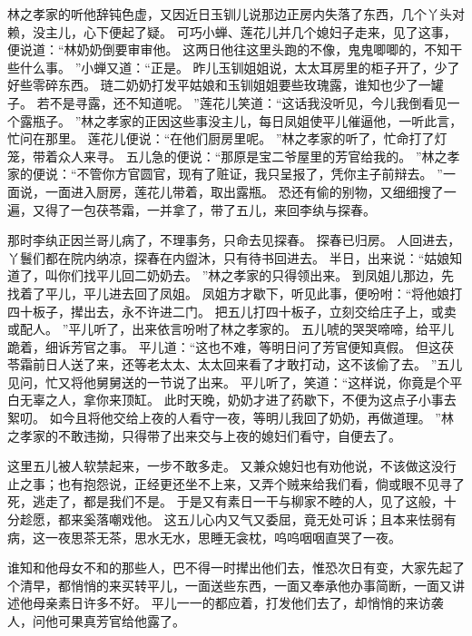 林之孝家的听他辞钝色虚，又因近日玉钏儿说那边正房内失落了东西，几个丫头对赖，没主儿，心下便起了疑。
可巧小蝉、莲花儿并几个媳妇子走来，见了这事，便说道：“林奶奶倒要审审他。
这两日他往这里头跑的不像，鬼鬼唧唧的，不知干些什么事。
”小蝉又道：“正是。
昨儿玉钏姐姐说，太太耳房里的柜子开了，少了好些零碎东西。
琏二奶奶打发平姑娘和玉钏姐姐要些玫瑰露，谁知也少了一罐子。
若不是寻露，还不知道呢。
”莲花儿笑道：“这话我没听见，今儿我倒看见一个露瓶子。
”林之孝家的正因这些事没主儿，每日凤姐使平儿催逼他，一听此言，忙问在那里。
莲花儿便说：“在他们厨房里呢。
”林之孝家的听了，忙命打了灯笼，带着众人来寻。
五儿急的便说：“那原是宝二爷屋里的芳官给我的。
”林之孝家的便说：“不管你方官圆官，现有了赃证，我只呈报了，凭你主子前辩去。
”一面说，一面进入厨房，莲花儿带着，取出露瓶。
恐还有偷的别物，又细细搜了一遍，又得了一包茯苓霜，一并拿了，带了五儿，来回李纨与探春。
\par
那时李纨正因兰哥儿病了，不理事务，只命去见探春。
探春已归房。
人回进去，丫鬟们都在院内纳凉，探春在内盥沐，只有待书回进去。
半日，出来说：“姑娘知道了，叫你们找平儿回二奶奶去。
”林之孝家的只得领出来。
到凤姐儿那边，先找着了平儿，平儿进去回了凤姐。
凤姐方才歇下，听见此事，便吩咐：“将他娘打四十板子，撵出去，永不许进二门。
把五儿打四十板子，立刻交给庄子上，或卖或配人。
”平儿听了，出来依言吩咐了林之孝家的。
五儿唬的哭哭啼啼，给平儿跪着，细诉芳官之事。
平儿道：“这也不难，等明日问了芳官便知真假。
但这茯苓霜前日人送了来，还等老太太、太太回来看了才敢打动，这不该偷了去。
”五儿见问，忙又将他舅舅送的一节说了出来。
平儿听了，笑道：“这样说，你竟是个平白无辜之人，拿你来顶缸。
此时天晚，奶奶才进了药歇下，不便为这点子小事去絮叨。
如今且将他交给上夜的人看守一夜，等明儿我回了奶奶，再做道理。
”林之孝家的不敢违拗，只得带了出来交与上夜的媳妇们看守，自便去了。
\par
这里五儿被人软禁起来，一步不敢多走。
又兼众媳妇也有劝他说，不该做这没行止之事；也有抱怨说，正经更还坐不上来，又弄个贼来给我们看，倘或眼不见寻了死，逃走了，都是我们不是。
于是又有素日一干与柳家不睦的人，见了这般，十分趁愿，都来奚落嘲戏他。
这五儿心内又气又委屈，竟无处可诉；且本来怯弱有病，这一夜思茶无茶，思水无水，思睡无衾枕，呜呜咽咽直哭了一夜。
\par
谁知和他母女不和的那些人，巴不得一时撵出他们去，惟恐次日有变，大家先起了个清早，都悄悄的来买转平儿，一面送些东西，一面又奉承他办事简断，一面又讲述他母亲素日许多不好。
平儿一一的都应着，打发他们去了，却悄悄的来访袭人，问他可果真芳官给他露了。

